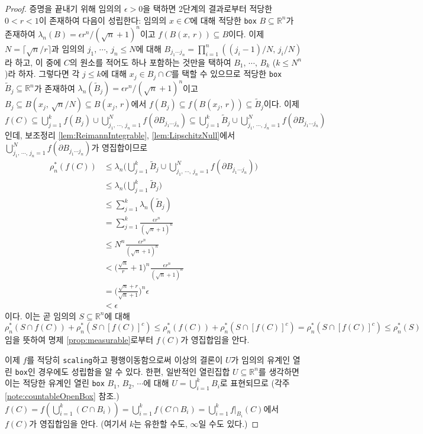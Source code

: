 \begin{proof}
    증명을 끝내기 위해 임의의 $\epsilon>0$을 택하면 2단계의 결과로부터 적당한 $0<r<1$이 존재하여 다음이 성립한다: 임의의 $x\in C$에 대해 적당한 \texttt{box} $B\subseteq\mathbb{R}^n$가 존재하여 $\lambda_n(B)=\epsilon r^n/(\sqrt{n}+1)^n$이고 $f(B(x,\,r))\subseteq B$이다. 이제 $N=\lceil\sqrt{n}/r\rceil$과 임의의 $j_1,\,\cdots$, $j_n\leq N$에 대해 $B_{j_1\cdots j_n}=\prod_{i=1}^n((j_i-1)/N,\,j_i/N)$라 하고, 이 중에 $C$의 원소를 적어도 하나 포함하는 것만을 택하여 $B_1,\,\cdots,\,B_k$ ($k\leq N^n$)라 하자. 그렇다면 각 $j\leq k$에 대해 $x_j\in B_j\cap C$를 택할 수 있으므로 적당한 \texttt{box} $\widetilde{B}_j\subseteq\mathbb{R}^n$가 존재하여 $\lambda_n(\widetilde{B}_j)=\epsilon r^n/(\sqrt{n}+1)^n$이고 $B_j\subseteq B(x_j,\,\sqrt{n}/N)\subseteq B(x_j,\,r)$에서 $f(B_j)\subseteq f(B(x_j,\,r))\subseteq \widetilde{B}_j$이다. 이제 $f(C)\subseteq\bigcup_{j=1}^kf(B_j)\cup\bigcup_{j_1,\,\cdots,\,j_n=1}^Nf(\partial B_{j_1\cdots j_n})\subseteq\bigcup_{j=1}^k\widetilde{B}_j\cup\bigcup_{j_1,\,\cdots,\,j_n=1}^Nf(\partial B_{j_1\cdots j_n})$인데, 보조정리 \ref{lem:ReimannIntegrable}, \ref{lem:LipschitzNull}에서 $\bigcup_{j_1,\,\cdots,\,j_n=1}^Nf(\partial B_{j_1\cdots j_n})$가 영집합이므로
    \begin{align*}
        \rho_n^*(f(C))&\leq\lambda_n\bigg(\bigcup_{j=1}^k\widetilde{B}_j\cup \bigcup_{j_1,\,\cdots,\,j_n=1}^Nf(\partial B_{j_1\cdots j_n})\bigg)\\
        &\leq\lambda_n\bigg(\bigcup_{j=1}^k\widetilde{B}_j\bigg)\\
        &\leq\sum_{j=1}^k\lambda_n(\widetilde{B}_j)\\
        &=\sum_{j=1}^k\frac{\epsilon r^n}{(\sqrt{n}+1)^n}\\
        &\leq N^n\frac{\epsilon r^n}{(\sqrt{n}+1)^n}\\
        &<\bigg(\frac{\sqrt{n}}{r}+1\bigg)^n\frac{\epsilon r^n}{(\sqrt{n}+1)^n}\\
        &=\bigg(\frac{\sqrt{n}+r}{\sqrt{n}+1}\bigg)^n\epsilon\\
        &<\epsilon
    \end{align*}
    이다. 이는 곧 임의의 $S\subseteq\mathbb{R}^n$에 대해 $\rho_n^*(S\cap f(C))+\rho_n^*(S\cap[f(C)]^c)\leq\rho_n^*(f(C))+\rho_n^*(S\cap[f(C)]^c)=\rho_n^*(S\cap[f(C)]^c)\leq\rho_n^*(S)$임을 뜻하여 명제 \ref{prop:measurable}로부터 $f(C)$가 영집합임을 안다.

    이제 $f$를 적당히 \texttt{scaling}하고 평행이동함으로써 이상의 결론이 $U$가 임의의 유계인 열린 \texttt{box}인 경우에도 성립함을 알 수 있다. 한편, 일반적인 열린집합 $U\subseteq\mathbb{R}^n$를 생각하면 이는 적당한 유계인 열린 \texttt{box} $B_1,\,B_2,\,\cdots$에 대해 $U=\bigcup_{i=1}^kB_i$로 표현되므로 (각주 \ref{note:countableOpenBox} 참조.) $f(C)=f(\bigcup_{i=1}^k(C\cap B_i))=\bigcup_{i=1}^kf(C\cap B_i)=\bigcup_{i=1}^kf\vert_{B_i}(C)$에서 $f(C)$가 영집합임을 안다. (여기서 $k$는 유한할 수도, $\infty$일 수도 있다.)
\end{proof}

